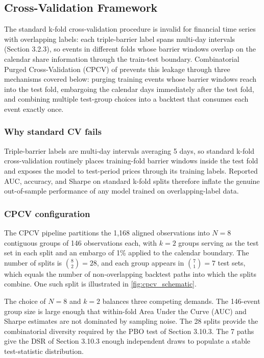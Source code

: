 \subsection{Cross-Validation Framework}\label{subsec:cpcv}

The standard k-fold cross-validation procedure is invalid for financial time series with overlapping labels: each triple-barrier label spans multi-day intervals (Section 3.2.3), so events in different folds whose barrier windows overlap on the calendar share information through the train-test boundary. Combinatorial Purged Cross-Validation (CPCV) of \citet[Chapter 12]{lopez_de_prado_2018} prevents this leakage through three mechanisms covered below: purging training events whose barrier windows reach into the test fold, embargoing the calendar days immediately after the test fold, and combining multiple test-group choices into a backtest that consumes each event exactly once.


\subsubsection{Why standard CV fails}\label{subsubsec:cv_fail}

Triple-barrier labels are multi-day intervals averaging 5 days, so standard k-fold cross-validation routinely places training-fold barrier windows inside the test fold and exposes the model to test-period prices through its training labels. Reported AUC, accuracy, and Sharpe on standard k-fold splits therefore inflate the genuine out-of-sample performance of any model trained on overlapping-label data.


\subsubsection{CPCV configuration}\label{subsubsec:cpcv_config}

The CPCV pipeline partitions the 1,168 aligned observations into $N = 8$ contiguous groups of 146 observations each, with $k = 2$ groups serving as the test set in each split and an embargo of 1\% applied to the calendar boundary. The number of splits is $\binom{8}{2} = 28$, and each group appears in $\binom{7}{1} = 7$ test sets, which equals the number of non-overlapping backtest paths into which the splits combine. One such split is illustrated in \label{ref:cpcv_schematic_call}\autoref{fig:cpcv_schematic}.

The choice of $N = 8$ and $k = 2$ balances three competing demands. The 146-event group size is large enough that within-fold Area Under the Curve (AUC) and Sharpe estimates are not dominated by sampling noise. The 28 splits provide the combinatorial diversity required by the PBO test of Section 3.10.3. The 7 paths give the DSR of Section 3.10.3 enough independent draws to populate a stable test-statistic distribution.


